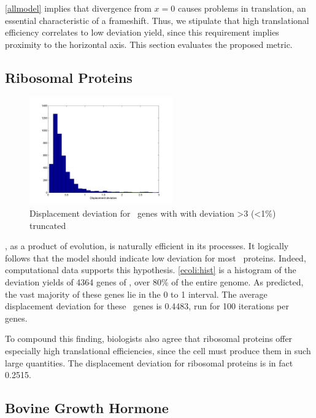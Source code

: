 \documentclass[12pt]{article}
\numberwithin{equation}{section}
\begin{document}
\autoref{allmodel} implies that divergence from $x=0$ causes
problems in translation, an essential characteristic
of a frameshift.  Thus, we stipulate that high translational efficiency correlates to low deviation yield,
since this requirement implies proximity to the horizontal axis.  This section
evaluates the proposed metric.

\subsection{Ribosomal Proteins}


\begin{figure}
  \centering
  \caption{Displacement deviation for \ecoli\ genes with with
    deviation >3 (<1\%) truncated}
  \label{ecoli:hist}
  \includegraphics[width=0.55\textwidth]{histograms/everything}
\end{figure}

\ecoli, as a product of evolution, is naturally efficient in its
processes.  It logically follows that the model should indicate low deviation
for most \ecoli\ proteins.  Indeed, computational data supports this hypothesis.
\autoref{ecoli:hist} is a histogram of the deviation yields of 4364 genes of
\ecoli, over 80\% of the entire genome.  As predicted, the vast majority
of these genes lie in the 0 to 1 interval.  The average displacement deviation
for these \ecoli\ genes is 0.4483, run for 100 iterations per genes.

To compound this finding, biologists also agree that ribosomal proteins
offer especially high translational efficiencies, since the cell must produce
them in such large quantities.  The displacement deviation for ribosomal
proteins is in fact 0.2515.

\subsection{Bovine Growth Hormone}
\label{section:bgh}
\end{document}
